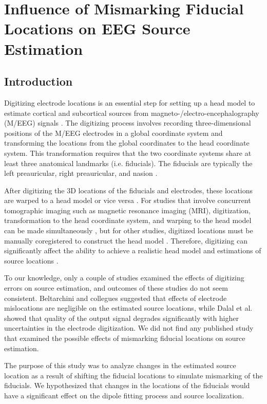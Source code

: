 \documentclass[../thesis_seyed.tex]{subfiles}
\begin{document}
\chapter{Influence of Mismarking Fiducial Locations on EEG Source Estimation}
\section{Introduction}

Digitizing electrode locations is an essential step for setting up a head model to estimate cortical and subcortical sources from magneto-/electro-encephalography (M/EEG) signals \cite{Koessler2007-qg}. The digitizing process involves recording three-dimensional positions of the M/EEG electrodes in a global coordinate system and transforming the locations from the global coordinates to the head coordinate system. This transformation requires that the two coordinate systems share at least three anatomical landmarks (i.e. fiducials). The fiducials are typically the left preauricular, right preauricular, and nasion \cite{Koessler2007-qg,Fuchs2007-dd}.

After digitizing the 3D locations of the fiducials and electrodes, these locations are warped to a head model or vice versa \cite{Akalin_Acar2013-rv}. For studies that involve concurrent tomographic imaging such as magnetic resonance imaging (MRI), digitization, transformation to the head coordinate system, and warping to the head model can be made simultaneously \cite{Marino2016-pu}, but for other studies, digitized locations must be manually coregistered to construct the head model \cite{Koessler2007-qg}. Therefore, digitizing can significantly affect the ability to achieve a realistic head model and estimations of source locations \cite{Akalin_Acar2013-rv}.

To our knowledge, only a couple of studies examined the effects of digitizing errors on source estimation, and outcomes of these studies do not seem consistent. Beltarchini and collegues \cite{Beltrachini2011-je} suggested that effects of electrode mislocations are negligible on the estimated source locations, while Dalal et al. \cite{Dalal2014-nk} showed that quality of the output signal degrades significantly with higher uncertainties in the electrode digitization. We did not find any published study that examined the possible effects of mismarking fiducial locations on source estimation.

The purpose of this study was to analyze changes in the estimated source location as a result of shifting the fiducial locations to simulate mismarking of the fiducials. We hypothesized that changes in the locations of the fiducials would have a significant effect on the dipole fitting process and source localization.
\end{document}

